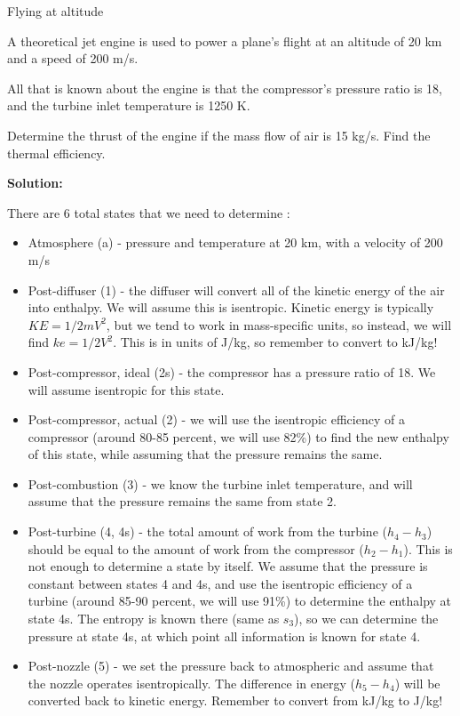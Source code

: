\begin{example}{Flying at altitude}

  A theoretical jet engine is used to power a plane's flight at an altitude of 20 km and a speed of 200 m/s.  

  All that is known about the engine is that the compressor's pressure ratio is 18, and the turbine inlet temperature is 1250 K.

  Determine the thrust of the engine if the mass flow of air is 15 kg/s.  Find the thermal efficiency.
  \vspace{1em}
  
  {\bf Solution:}

  There are 6 total states that we need to determine :
  \begin{itemize}
  \item Atmosphere (a) - pressure and temperature at 20 km, with a velocity of 200 m/s \answer{[5474 Pa, 216.65 K]}
  \item Post-diffuser (1) - the diffuser will convert all of the kinetic energy of the air into enthalpy.  We will assume this is isentropic.  Kinetic energy is typically $KE = 1/2 m V^2$, but we tend to work in mass-specific units, so instead, we will find $ke = 1/2 V^2$.  This is in units of J/kg, so remember to convert to kJ/kg! \answer{[$h_1=$ 362.9 kJ/kg, $p_1$ = 7446 Pa]}
  \item Post-compressor, ideal (2s) - the compressor has a pressure ratio of 18.  We will assume isentropic for this state. \answer{[$h_{2s}$=668 kJ/kg]}
  \item Post-compressor, actual (2) - we will use the isentropic efficiency of a compressor (around 80-85 percent, we will use 82\%) to find the new enthalpy of this state, while assuming that the pressure remains the same. \answer{[$h_{2}$=735 kJ/kg]}
  \item Post-combustion (3) - we know the turbine inlet temperature, and will assume that the pressure remains the same from state 2. \answer{[$h_{3}$=1463 kJ/kg]}
  \item Post-turbine (4, 4s) - the total amount of work from the turbine ($h_4-h_3$) should be equal to the amount of work from the compressor ($h_2-h_1$).  This is not enough to determine a state by itself.  We assume that the pressure is constant between states 4 and 4s, and use the isentropic efficiency of a turbine (around 85-90 percent, we will use 91\%) to determine the enthalpy at state 4s.  The entropy is known there (same as $s_3$), so we can determine the pressure at state 4s, at which point all information is known for state 4. \answer{[$h_{4}$= 1091 kJ/kg, $h_{4s}$ = 1055 kJ/kg]}
  \item Post-nozzle (5) - we set the pressure back to atmospheric and assume that the nozzle operates isentropically.  The difference in energy ($h_5-h_4$) will be converted back to kinetic energy.  Remember to convert from kJ/kg to J/kg! \answer{[$h_{5}$=699 kJ/kg]}
  \end{itemize}


\end{example}
